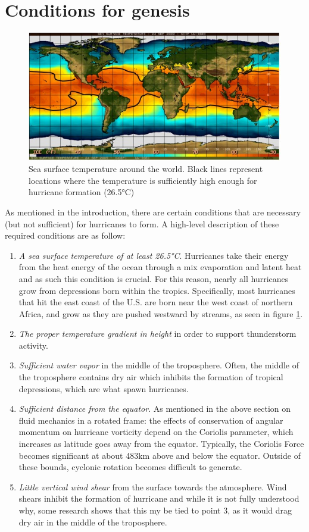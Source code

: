 \section{Conditions for genesis}
\begin{figure}
    \centering
    \includegraphics[width=0.7\linewidth]{assets/SSTforGlobalOcean1.jpg}
    \caption{Sea surface temperature around the world. Black lines represent locations where the temperature is sufficiently high enough for hurricane formation (26.5°C)}
    \label{fig:temp}
\end{figure}
As mentioned in the introduction, there are certain conditions that are necessary (but not sufficient) for hurricanes to form. A high-level description of these required conditions are as follow:
\begin{enumerate}
    \item \textit{A sea surface temperature of at least 26.5°C}. Hurricanes take their energy from the heat energy of the ocean through a mix evaporation and latent heat and as such this condition is crucial. For this reason, nearly all hurricanes grow from depressions born within the tropics. Specifically, most hurricanes that hit the east coast of the U.S. are born near the west coast of northern Africa, and grow as they are pushed westward by streams, as seen in figure \ref{fig:temp}. \cite{develop}
    \item \textit{The proper temperature gradient in height} in order to support thunderstorm activity. \cite{develop}
    \item \textit{Sufficient water vapor} in the middle of the troposphere. Often, the middle of the troposphere contains dry air which inhibits the formation of tropical depressions, which are what spawn hurricanes. \cite{develop}
    \item \textit{Sufficient distance from the equator}. As mentioned in the above section on fluid mechanics in a rotated frame: the effects of conservation of angular momentum on hurricane vorticity depend on the Coriolis parameter, which increases as latitude goes away from the equator. Typically, the Coriolis Force becomes significant at about 483km above and below the equator. Outside of these bounds, cyclonic rotation becomes difficult to generate. \cite{develop}
    \item \textit{Little vertical wind shear} from the surface towards the atmosphere. Wind shears inhibit the formation of hurricane and while it is not fully understood why, some research shows that this my be tied to point 3, as it would drag dry air in the middle of the troposphere.
\end{enumerate}


